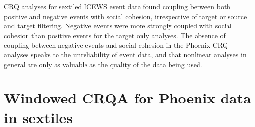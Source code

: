\begin{appendix}
CRQ analyses for sextiled ICEWS event data found coupling between both
positive and negative events with social cohesion, irrespective of
target or source and target filtering. Negative events were more
strongly coupled with social cohesion than positive events for the
target only analyses. The absence of coupling between negative events
and social cohesion in the Phoenix CRQ analyses speaks to the
unreliability of event data, and that nonlinear analyses in general are
only as valuable as the quality of the data being used.

\hypertarget{windowed-crqa-for-phoenix-data-in-sextiles}{%
\section{Windowed CRQA for Phoenix data in
sextiles}\label{windowed-crqa-for-phoenix-data-in-sextiles}}


\end{appendix}
